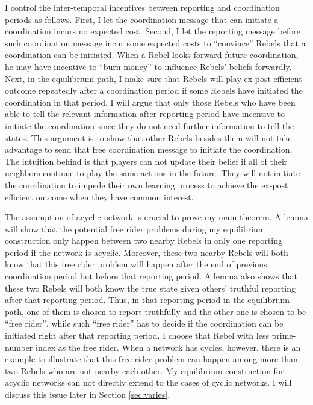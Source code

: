 \documentclass[12pt,letter]{article}
\theoremstyle{definition}
\theoremstyle{remark}
\theoremstyle{claim}
\begin{document}
I control the inter-temporal incentives between reporting and coordination periods as follows. First, I let the coordination message that can initiate a coordination incurs no expected cost. Second, I let the reporting message before such coordination message incur some expected costs to ``convince'' Rebels that a coordination can be initiated. When a Rebel looks forward future coordination, he may have incentive to ``burn money'' to influence Rebels' beliefs forwardly. Next, in the equilibrium path, I make sure that Rebels will play ex-post efficient outcome repeatedly after a coordination period if some Rebels have initiated the coordination in that period. I will argue that only those Rebels who have been able to tell the relevant information after reporting period have incentive to initiate the coordination since they do not need further information to tell the states. This argument is to show that other Rebels besides them will not take advantage to send that free coordination message to initiate the coordination. The intuition behind is that players can not update their belief if all of their neighbors continue to play the same actions in the future. They will not initiate the coordination to impede their own learning process to achieve the ex-post efficient outcome when they have common interest.


The assumption of acyclic network is crucial to prove my main theorem. A lemma will show that the potential free rider problems during my equilibrium construction only happen between two nearby Rebels in only one reporting period if the network is acyclic. Moreover, these two nearby Rebels will both know that this free rider problem will happen after the end of previous coordination period but before that reporting period. A lemma also shows that these two Rebels will both know the true state given others' truthful reporting after that reporting period. Thus, in that reporting period in the equilibrium path, one of them is chosen to report truthfully and the other one is chosen to be ``free rider'', while such ``free rider'' has to decide if the coordination can be initiated right after that reporting period. I choose that Rebel with less prime-number index as the free rider. When a network has cycles, however, there is an example to illustrate that this free rider problem can happen among more than two Rebels who are not nearby each other. My equilibrium construction for acyclic networks can not directly extend to the cases of cyclic networks. I will discuss this issue later in Section \ref{sec:varies}.
\end{document}
